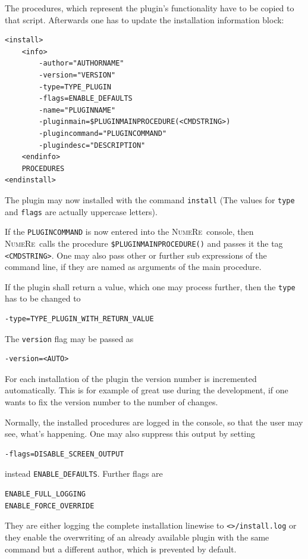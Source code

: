 \documentclass[DIV=14,headsepline,footsepline]{scrbook}
\newcommand{\NR}{\textsc{Nu\-me\-Re}}
\begin{document}
				The procedures, which represent the plugin's functionality have to be copied to that script. Afterwards one has to update the installation information block:
				\begin{lstlisting}
<install>
	<info>
		-author="AUTHORNAME"
		-version="VERSION"
		-type=TYPE_PLUGIN
		-flags=ENABLE_DEFAULTS
		-name="PLUGINNAME"
		-pluginmain=$PLUGINMAINPROCEDURE(<CMDSTRING>)
		-plugincommand="PLUGINCOMMAND"
		-plugindesc="DESCRIPTION"
	<endinfo>
	PROCEDURES
<endinstall>
				\end{lstlisting}
				The plugin may now installed with the command \lstinline+install+ (The values for \lstinline+type+ and \lstinline+flags+ are actually uppercase letters).
				
				If the \lstinline+PLUGINCOMMAND+ is now entered into the \NR\ console, then \NR\ calls the procedure \lstinline+$PLUGINMAINPROCEDURE()+ and passes it the tag \lstinline+<CMDSTRING>+. One may also pass other or further sub expressions of the command line, if they are named as arguments of the main procedure.
				
				If the plugin shall return a value, which one may process further, then the \lstinline+type+ has to be changed to
				\begin{lstlisting}
-type=TYPE_PLUGIN_WITH_RETURN_VALUE
				\end{lstlisting}
				
				The \lstinline+version+ flag may be passed as
				\begin{lstlisting}
-version=<AUTO>
				\end{lstlisting}
				For each installation of the plugin the version number is incremented automatically. This is for example of great use during the development, if one wants to fix the version number to the number of changes.
				
				Normally, the installed procedures are logged in the console, so that the user may see, what's happening. One may also suppress this output by setting
				\begin{lstlisting}
-flags=DISABLE_SCREEN_OUTPUT
				\end{lstlisting}
				instead \lstinline+ENABLE_DEFAULTS+. Further flags are
				\begin{lstlisting}
ENABLE_FULL_LOGGING
ENABLE_FORCE_OVERRIDE
				\end{lstlisting}
				They are either logging the complete installation linewise to \lstinline+<>/install.log+ or they enable the overwriting of an already available plugin with the same command but a different author, which is prevented by default.
				
\end{document}
